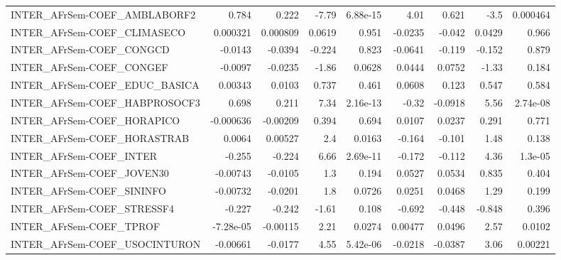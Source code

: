 \begin{tabular}{lrrrrrrrr}
INTER\_AFrSem-COEF\_AMBLABORF2           &       0.784 &        0.222 &    -7.79 & 6.88e-15 &       4.01 &       0.621 &         -3.5 &      0.000464 \\
INTER\_AFrSem-COEF\_CLIMASECO            &    0.000321 &     0.000809 &   0.0619 &    0.951 &    -0.0235 &      -0.042 &       0.0429 &         0.966 \\
INTER\_AFrSem-COEF\_CONGCD               &     -0.0143 &      -0.0394 &   -0.224 &    0.823 &    -0.0641 &      -0.119 &       -0.152 &         0.879 \\
INTER\_AFrSem-COEF\_CONGEF               &     -0.0097 &      -0.0235 &    -1.86 &   0.0628 &     0.0444 &      0.0752 &        -1.33 &         0.184 \\
INTER\_AFrSem-COEF\_EDUC\_BASICA          &     0.00343 &       0.0103 &    0.737 &    0.461 &     0.0608 &       0.123 &        0.547 &         0.584 \\
INTER\_AFrSem-COEF\_HABPROSOCF3          &       0.698 &        0.211 &     7.34 & 2.16e-13 &      -0.32 &     -0.0918 &         5.56 &      2.74e-08 \\
INTER\_AFrSem-COEF\_HORAPICO             &   -0.000636 &     -0.00209 &    0.394 &    0.694 &     0.0107 &      0.0237 &        0.291 &         0.771 \\
INTER\_AFrSem-COEF\_HORASTRAB            &      0.0064 &      0.00527 &      2.4 &   0.0163 &     -0.164 &      -0.101 &         1.48 &         0.138 \\
INTER\_AFrSem-COEF\_INTER                &      -0.255 &       -0.224 &     6.66 & 2.69e-11 &     -0.172 &      -0.112 &         4.36 &       1.3e-05 \\
INTER\_AFrSem-COEF\_JOVEN30              &    -0.00743 &      -0.0105 &      1.3 &    0.194 &     0.0527 &      0.0534 &        0.835 &         0.404 \\
INTER\_AFrSem-COEF\_SININFO              &    -0.00732 &      -0.0201 &      1.8 &   0.0726 &     0.0251 &      0.0468 &         1.29 &         0.199 \\
INTER\_AFrSem-COEF\_STRESSF4             &      -0.227 &       -0.242 &    -1.61 &    0.108 &     -0.692 &      -0.448 &       -0.848 &         0.396 \\
INTER\_AFrSem-COEF\_TPROF                &   -7.28e-05 &     -0.00115 &     2.21 &   0.0274 &    0.00477 &      0.0496 &         2.57 &        0.0102 \\
INTER\_AFrSem-COEF\_USOCINTURON          &    -0.00661 &      -0.0177 &     4.55 & 5.42e-06 &    -0.0218 &     -0.0387 &         3.06 &       0.00221 \\

\end{tabular}
